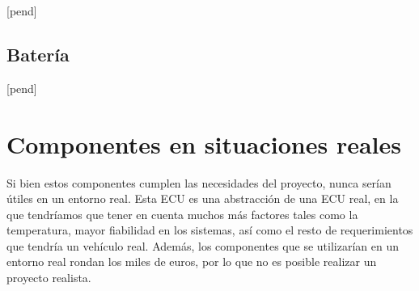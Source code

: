 [pend]

 \subsection*{Batería}
[pend]

\section{Componentes en situaciones reales}

Si bien estos componentes cumplen las necesidades del proyecto, nunca serían útiles en un entorno real. Esta ECU es una abstracción de una ECU real, en la que tendríamos que tener en cuenta muchos más factores tales como la temperatura, mayor fiabilidad en los sistemas, así como el resto de requerimientos que tendría un vehículo real. Además, los componentes que se utilizarían en un entorno real rondan los miles de euros, por lo que no es posible realizar un proyecto realista. 